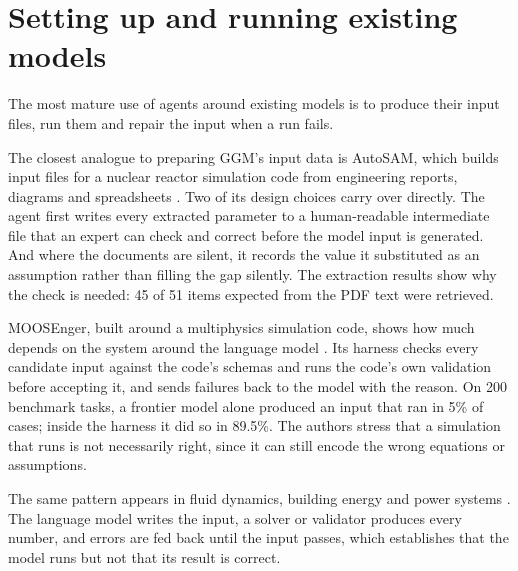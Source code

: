 \section{Setting up and running existing models}

The most mature use of agents around existing models is to produce their input files, run them and repair the input when a run fails.

The closest analogue to preparing GGM's input data is AutoSAM, which builds input files for a nuclear reactor simulation code from engineering reports, diagrams and spreadsheets \citep{abulawi2026autosam}.
Two of its design choices carry over directly.
The agent first writes every extracted parameter to a human-readable intermediate file that an expert can check and correct before the model input is generated.
And where the documents are silent, it records the value it substituted as an assumption rather than filling the gap silently.
The extraction results show why the check is needed: 45 of 51 items expected from the PDF text were retrieved.

MOOSEnger, built around a multiphysics simulation code, shows how much depends on the system around the language model \citep{li2026moosenger}.
Its harness checks every candidate input against the code's schemas and runs the code's own validation before accepting it, and sends failures back to the model with the reason.
On 200 benchmark tasks, a frontier model alone produced an input that ran in 5\% of cases; inside the harness it did so in 89.5\%.
The authors stress that a simulation that runs is not necessarily right, since it can still encode the wrong equations or assumptions.

The same pattern appears in fluid dynamics, building energy and power systems \citep{yue2026foam, jiang2024eplus, jin2025gridmind}.
The language model writes the input, a solver or validator produces every number, and errors are fed back until the input passes, which establishes that the model runs but not that its result is correct.
